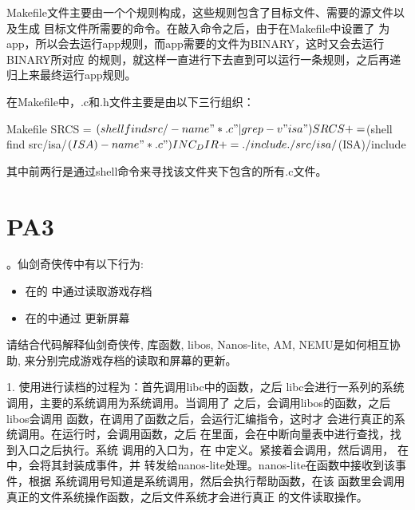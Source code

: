 \vspace{0.5em}

  Makefile文件主要由一个个规则构成，这些规则包含了目标文件、需要的源文件以及生成
  目标文件所需要的命令。在敲入命令之后，由于在Makefile中设置了
  为app，所以会去运行app规则，而app需要的文件为BINARY，这时又会去运行BINARY所对应
  的规则，就这样一直进行下去直到可以运行一条规则，之后再递归上来最终运行app规则。

  在Makefile中，.c和.h文件主要是由以下三行组织：
\begin{codes*}{Makefile}
SRCS = $(shell find src/ -name "*.c" | grep -v "isa")
SRCS += $(shell find src/isa/$(ISA) -name "*.c")
INC_DIR += ./include ./src/isa/$(ISA)/include
\end{codes*}
  其中前两行是通过shell命令来寻找该文件夹下包含的所有.c文件。

\section{PA3}
  。仙剑奇侠传中有以下行为:
  \begin{itemize}
    \item 在的
      中通过读取游戏存档
    \item 在的中通过
      更新屏幕
  \end{itemize}

  请结合代码解释仙剑奇侠传, 库函数, libos, Nanos-lite, AM, NEMU是如何相互协助,
  来分别完成游戏存档的读取和屏幕的更新。

\vspace{0.5em}

  1. 使用进行读档的过程为：首先调用libc中的函数，之后
  libc会进行一系列的系统调用，主要的系统调用为系统调用。当调用了
  之后，会调用libos的函数，之后libos会调用
  函数，在调用了函数之后，会运行汇编指令，这时才
  会进行真正的系统调用。在运行时，会调用函数，之后
  在里面，会在中断向量表中进行查找，找到入口之后执行。系统
  调用的入口为，在
  中定义。紧接着会调用，然后调用，
  在中，会将其封装成事件，并
  转发给nanos-lite处理。nanos-lite在函数中接收到该事件，根据
  系统调用号知道是系统调用，然后会执行帮助函数，在该
  函数里会调用真正的文件系统操作函数，之后文件系统才会进行真正
  的文件读取操作。

